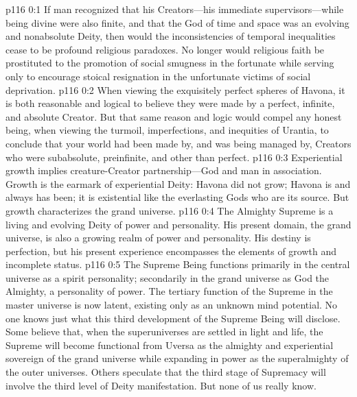 \author{Mighty Messenger}
\vs p116 0:1 If man recognized that his Creators---his immediate supervisors---while being divine were also finite, and that the God of time and space was an evolving and nonabsolute Deity, then would the inconsistencies of temporal inequalities cease to be profound religious paradoxes. No longer would religious faith be prostituted to the promotion of social smugness in the fortunate while serving only to encourage stoical resignation in the unfortunate victims of social deprivation.
\vs p116 0:2 When viewing the exquisitely perfect spheres of Havona, it is both reasonable and logical to believe they were made by a perfect, infinite, and absolute Creator. But that same reason and logic would compel any honest being, when viewing the turmoil, imperfections, and inequities of Urantia, to conclude that your world had been made by, and was being managed by, Creators who were subabsolute, preinfinite, and other than perfect.
\pc \vs p116 0:3 Experiential growth implies creature\hyp{}Creator partnership---God and man in association. Growth is the earmark of experiential Deity: Havona did not grow; Havona is and always has been; it is existential like the everlasting Gods who are its source. But growth characterizes the grand universe.
\vs p116 0:4 The Almighty Supreme is a living and evolving Deity of power and personality. His present domain, the grand universe, is also a growing realm of power and personality. His destiny is perfection, but his present experience encompasses the elements of growth and incomplete status.
\pc \vs p116 0:5 The Supreme Being functions primarily in the central universe as a spirit personality; secondarily in the grand universe as God the Almighty, a personality of power. The tertiary function of the Supreme in the master universe is now latent, existing only as an unknown mind potential. No one knows just what this third development of the Supreme Being will disclose. Some believe that, when the superuniverses are settled in light and life, the Supreme will become functional from Uversa as the almighty and experiential sovereign of the grand universe while expanding in power as the superalmighty of the outer universes. Others speculate that the third stage of Supremacy will involve the third level of Deity manifestation. But none of us really know.\plusone
{}%
